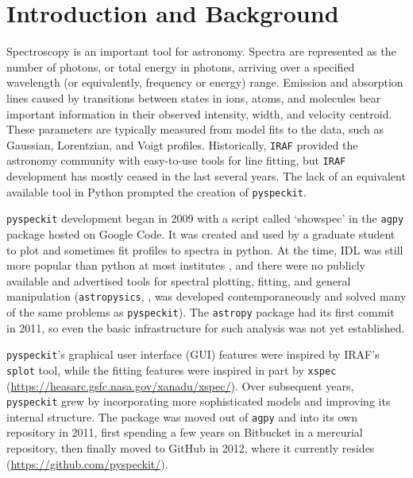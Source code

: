 \documentclass[twocolumn]{aastex63}
\newcommand{\pyspeckit}{\texttt{pyspeckit}\xspace}
\newcommand{\astropy}{\texttt{astropy}\xspace}
\begin{document}
\section{Introduction and Background}
Spectroscopy is an important tool for astronomy. Spectra are represented as
the number of photons, or total energy in photons, arriving over a specified
wavelength (or equivalently, frequency or energy) range. Emission and
absorption lines caused by transitions between states in ions, atoms, and molecules bear important information
in their observed intensity, width, and velocity centroid. These parameters are
typically measured from model fits to the data, such as Gaussian, Lorentzian,
and Voigt profiles. Historically, \texttt{IRAF} \citep{iraf} provided the astronomy
community with easy-to-use tools for line fitting, but \texttt{IRAF}
development has mostly ceased in the last several years.
The lack of an equivalent available
tool in Python prompted the creation of \pyspeckit.


\pyspeckit development began in 2009 with a script called `showspec' in the
\texttt{agpy} package hosted on Google Code. It was created and used by a
graduate student to plot and sometimes fit profiles to spectra in python. At
the time, IDL was still more popular than python at most institutes
\citep[the first evidence
that python had overtaken IDL in popularity among astronomers was presented in
][]{Momcheva2015a}, and there were no publicly available and advertised
tools for spectral plotting, fitting, and general manipulation
(\texttt{astropysics}, \citealt{Tollerud2012a}, was developed contemporaneously and
solved many of the same problems as \pyspeckit). The \astropy package
\citep{AstropyCollaboration2013,AstropyCollaboration2018} had its first commit in
2011, so even the basic infrastructure for such analysis was
not yet established.

\pyspeckit's graphical user interface (GUI) features were inspired by IRAF's
\texttt{splot} tool, while the fitting features were inspired in part by \texttt{xspec}
(\url{https://heasarc.gsfc.nasa.gov/xanadu/xspec/}).  Over subsequent years,
\pyspeckit grew by incorporating more sophisticated models  and improving its
internal structure.  The package was moved out of \texttt{agpy} and into its
own repository in 2011, first spending a few years on Bitbucket in a mercurial
repository, then finally moved to GitHub in 2012, where it currently resides (\url{https://github.com/pyspeckit/}).
\end{document}
